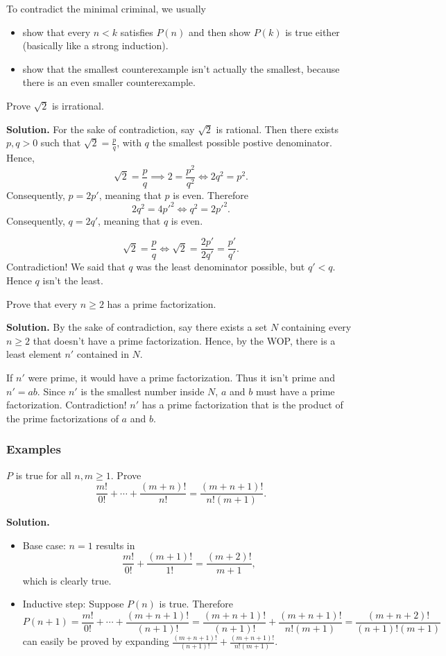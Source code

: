 To contradict the minimal criminal, we usually
\begin{itemize}
	\item show that every $n<k$ satisfies $P(n)$ and then show $P(k)$ is true either (basically like a strong induction).
	\item show that the smallest counterexample isn't actually the smallest, because there is an even smaller counterexample.
\end{itemize}

\begin{example}{}{}
	Prove $\sqrt{2}$ is irrational.
\end{example}
\textcolor{color2}{\textbf{Solution. }} For the sake of contradiction, say $\sqrt{2}$ is rational. Then there exists $p,q>0$ such that $\sqrt{2}=\frac{p}{q}$,
with $q$ the smallest possible postive denominator.
Hence,
\[
	\sqrt{2} = \frac{p}{q}\implies 2=\frac{p^2}{q^2} \iff 2q^2=p^2.
\]
Consequently, $p=2p'$, meaning that $p$ is even. Therefore
\[
	2q^2=4p'^2 \iff q^2=2p'^2.
\]
Consequently, $q=2q'$, meaning that $q$ is even.

\[
	\sqrt{2}=\frac{p}{q} \iff \sqrt{2}=\frac{2p'}{2q'} = \frac{p'}{q'}.
\]
Contradiction! We said that $q$ was the least denominator possible, but $q'<q$. Hence $q$ isn't the least.
\begin{example}{}{}
	Prove that every $n \geq 2$ has a prime factorization.
\end{example}
\textcolor{color2}{\textbf{Solution. }} By the sake of contradiction, say there exists a set $N$ containing every $n\ge 2$ that doesn't have a prime factorization.
Hence, by the WOP, there is a least element $n'$ contained in $N$.

If $n'$ were prime, it would have a prime factorization. Thus it isn't prime and $n'=ab$. Since $n'$ is the smallest number inside $N$, $a$ and $b$ must
have a prime factorization. Contradiction! $n'$ has a prime factorization that is the product of the prime factorizations of $a$ and $b$.

\subsubsection{Examples}
\begin{example}{}{}
	$P$ is true for all $n,m\ge1$. Prove
	\[
		\frac{m!}{0!} + \cdots + \frac{(m+n)!}{n!} = \frac{(m+n+1)!}{n!(m+1)}.
	\]
\end{example}
\textcolor{color2}{\textbf{Solution. }}
\begin{itemize}
	\item Base case: $n=1$ results in
	      \[
		      \frac{m!}{0!} + \frac{(m+1)!}{1!} = \frac{(m+2)!}{m+1},
	      \]
	      which is clearly true.
	\item Inductive step: Suppose $P(n)$ is true. Therefore
	      \[
		      P(n+1)= \frac{m!}{0!}+\cdots+\frac{(m+n+1)!}{(n+1)!}= \frac{(m+n+1)!}{(n+1)!} + \frac{(m+n+1)!}{n!(m+1)}
		      = \frac{(m+n+2)!}{(n+1)!(m+1)}
	      \]
	      can easily be proved by expanding $\frac{(m+n+1)!}{(n+1)!} + \frac{(m+n+1)!}{n!(m+1)}$.
\end{itemize}

